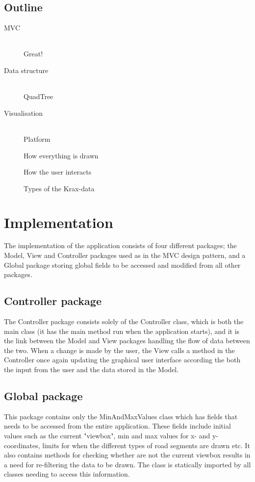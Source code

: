 \documentclass[a4paper,11pt]{article}
\begin{document}
\subsection{Outline}
\begin{description}
	\item[MVC] \hfill \\
	Great!
	\item[Data structure] \hfill \\
	QuadTree
	\item[Visualisation] \hfill \\
	Platform
	
	How everything is drawn
	
	How the user interacts
	
	Types of the Krax-data
\end{description}

\pagebreak
\section{Implementation} %
\label{sec:Implementation} %
The implementation of the application consists of four different packages; the Model, View and Controller packages used as in the MVC design pattern, and a Global package storing global fields to be accessed and modified from all other packages.


\subsection{Controller package} %
The Controller package consists solely of the Controller class, which is both the main class (it has the main method run when the application starts), and it is the link between the Model and View packages handling the flow of data between the two. When a change is made by the user, the View calls a method in the Controller once again updating the graphical user interface according the both the input from the user and the data stored in the Model.

\subsection{Global package} %
This package contains only the MinAndMaxValues class which has fields that needs to be accessed from the entire application. These fields include initial values such as the current "viewbox", min and max values for x- and y-coordinates, limits for when the different types of road segments are drawn etc. It also contains methods for checking whether are not the current viewbox results in a need for re-filtering the data to be drawn. The class is statically imported by all classes needing to access this information.
\end{document}
